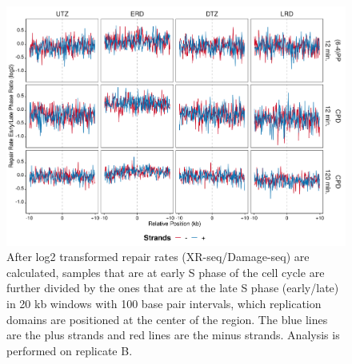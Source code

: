 \begin{figure}[H]
\begin{center}
\includegraphics[width=\textwidth]{Chapters/7_appendix/figures/supfig25}
\caption[Repair rate early/late phase ratio of replication domains in 20 kb (replicate B).]{After log2 transformed repair rates (XR-seq/Damage-seq) are calculated, samples that are at early S phase of the cell cycle are further divided by the ones that are at the late S phase (early/late) in 20 kb windows with 100 base pair intervals, which replication domains are positioned at the center of the region. The blue lines are the plus strands and red lines are the minus strands. Analysis is performed on replicate B.}
\label{supfig:rrel20repdomainB}
\end{center}
\end{figure}

